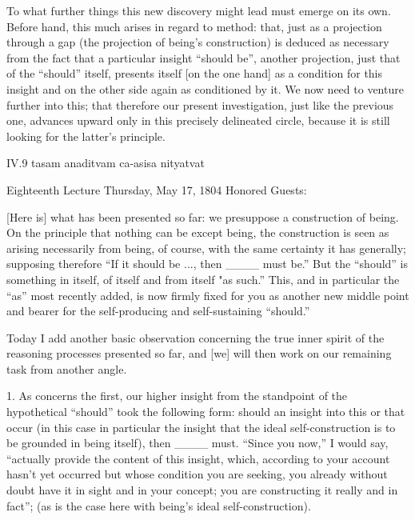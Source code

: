 To what further things this new discovery
might lead must emerge on its own.
Before hand, this much arises in regard to method:
that, just as a projection through a gap
(the projection of being's construction)
is deduced as necessary from the fact
that a particular insight “should be”,
another projection, just that of the “should” itself,
presents itself [on the one hand] as
a condition for this insight
and on the other side again as conditioned by it.
We now need to venture further into this;
that therefore our present investigation,
just like the previous one,
advances upward only in this
precisely delineated circle,
because it is still looking
for the latter's principle.

IV.9
tasam anaditvam ca-asisa nityatvat

Eighteenth Lecture
Thursday, May 17, 1804
Honored Guests:

[Here is] what has been presented so far:
we presuppose a construction of being.
On the principle that nothing can be except being,
the construction is seen as arising necessarily from being,
of course, with the same certainty it has generally;
supposing therefore “If it should be ..., then ____ must be.”
But the “should” is something in itself, of itself and from itself "as such.”
This, and in particular the “as” most recently added,
is now firmly fixed for you as another new middle point
and bearer for the self-producing and self-sustaining “should.”

Today I add another basic observation
concerning the true inner spirit of
the reasoning processes presented so far,
and [we] will then work on
our remaining task from another angle.

1. As concerns the first,
our higher insight from the standpoint of
the hypothetical “should” took the following form:
should an insight into this or that occur
(in this case in particular the insight that
the ideal self-construction is to be grounded in being itself),
then ____ must.
“Since you now,” I would say,
“actually provide the content of this insight,
which, according to your account hasn't yet occurred
but whose condition you are seeking,
you already without doubt have it
in sight and in your concept;
you are constructing it really and in fact”;
(as is the case here with being's ideal self-construction).


